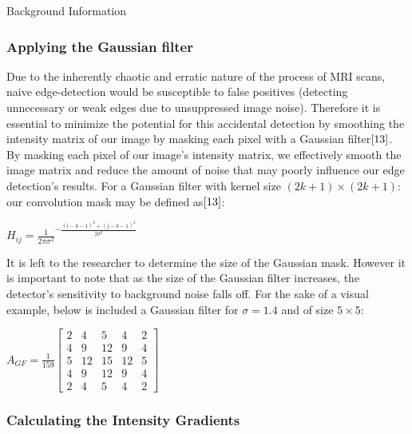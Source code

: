 \documentclass[a4paper,12pt]{article}
\begin{document}
\begin{section}{Background Information}
\subsubsection{Applying the Gaussian filter}

Due to the inherently chaotic and erratic nature of the process of MRI scans, naive edge-detection would be susceptible to false positives (detecting unnecessary or weak edges due to unsuppressed image noise). Therefore it is essential to minimize the potential for this accidental detection by smoothing the intensity matrix of our image by masking each pixel with a Gaussian filter$\cite{13}$.%
By masking each pixel of our image's intensity matrix, we effectively smooth the image matrix and reduce the amount of noise that may poorly influence our edge detection's results. For a Gaussian filter with kernel size $(2k+1)\times(2k+1)$: our convolution mask may be defined as$\cite{13}$:\\%
\begin{center}
$H_{ij} = \frac{1}{2\pi\sigma^{2}}^{-\frac{(i-k-1)^2+(j-k-1)^2}{2\sigma^2}}$
\end{center}

It is left to the researcher to determine the size of the Gaussian mask.
However it is important to note that as the size of the Gaussian filter increases, the detector's sensitivity to background noise falls off.
For the sake of a visual example, below is included a Gaussian filter for $\sigma = 1.4$ and of size $5\times5$:\\

\singlespacing
\begin{center}
$A_{GF} = \frac{1}{159}\begin{bmatrix}
	2	&	4	&	5	&	4	&	2\\
	4	&	9	&	{12}	&	9	&	4\\
	5	&	{12}	&	{15}	&	{12}	&	5\\
	4       &       9       &       {12}    &       9       &       4\\
	2       &       4       &       5       &       4       &       2
\end{bmatrix}$
\end{center}
\doublespacing

\subsubsection{Calculating the Intensity Gradients}


\end{section}
\end{document}
